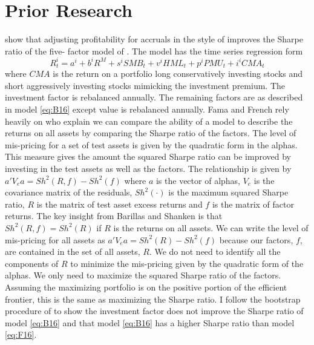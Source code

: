 
\section*{Prior Research}

\textcite{fama2016choosing} show that adjusting profitability for accruals in
the style of \textcite{ball2016accruals} improves the Sharpe ratio of the five-
factor model of \textcite{fama2015five}. The model has the time series
regression form \begin{equation} \label{eq:F16} R_t^i =
a^i+b^iR^M+s^iSMB_t+v^iHML_t+p^iPMU_t+i^iCMA_t \end{equation} where $CMA$ is
the return on a portfolio long conservatively investing stocks and short
aggressively investing stocks mimicking the investment premium. The investment
factor is rebalanced annually. The remaining factors are as described in model
\ref{eq:B16} except value is rebalanced annually. Fama and French rely heavily
on \textcite{barillas2016alpha} who explain we can compare the ability of a
model to describe the returns on all assets by comparing the Sharpe ratio of
the factors. The level of mis-pricing for a set of test assets is given by the
quadratic form in the alphas. This measure gives the amount the squared Sharpe
ratio can be improved by investing in the test assets as well as the factors.
The relationship is given by $a'V_ea=Sh^2\left(R,f\right)-Sh^2\left(f\right)$
where $a$ is the vector of alphas, $V_e$ is the covariance matrix of the
residuals, $Sh^2\left(\cdot\right)$ is the maximum squared Sharpe ratio, $R$ is
the matrix of test asset excess returns and $f$ is the matrix of factor
returns. The key insight from Barillas and Shanken is that
$Sh^2\left(R,f\right)=Sh^2\left(R\right)$ if $R$ is the returns on all assets.
We can write the level of mis-pricing for all assets as
$a'V_ea=Sh^2\left(R\right)-Sh^2\left(f\right)$ because our factors, $f$, are
contained in the set of all assets, $R$. We do not need to identify all the
components of $R$ to minimize the mis-pricing given by the quadratic form of
the alphas. We only need to maximize the squared Sharpe ratio of the factors.
Assuming the maximizing portfolio is on the positive portion of the efficient
frontier, this is the same as maximizing the Sharpe ratio. I follow the
bootstrap procedure of \textcite{fama2016choosing} to show the investment
factor does not improve the Sharpe ratio of model \ref{eq:B16} and that model
\ref{eq:B16} has a higher Sharpe ratio than model \ref{eq:F16}.

